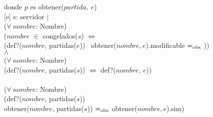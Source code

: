 \begin{Representacion}
    \vspace{2mm}
    donde $p$ es obtener($partida,\ e$) \\

    [e]{
        s: servidor | \\
            \tab ($\forall\ nombre$: Nombre)\\
                \tab\tab ($nombre$ $\in$ congelados($s$) $\Leftrightarrow$ \\
                \tab\tab (def?($nombre$, partidas($e$)) \yluego\ obtener($nombre, e$).modificable $=_{\mathrm{obs}}$ \false)) \\
            \tab $\wedge$ \\
            \tab ($\forall\ nombre$: Nombre)\\
                \tab\tab (def?($nombre$, partidas($s$)) $\Leftrightarrow$ def?($nombre$, $e$)) \\
            \tab \yluego \\
            \tab ($\forall\ nombre$: Nombre)\\
                \tab\tab (def?($nombre$, partidas($s$)) \impluego \\ 
                \tab\tab  obtener($nombre$, partidas($s$)) $=_{\mathrm{obs}}$ obtener($nombre, e$).sim) \\
    }
  
  \end{Representacion}